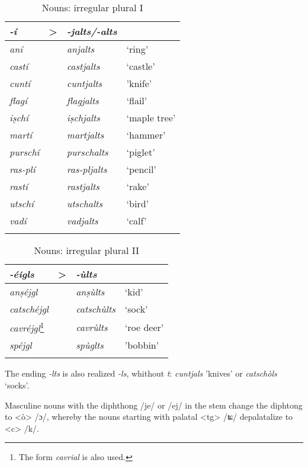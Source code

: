 \begin{table}
\caption{Nouns: irregular plural I}
\label{irregplI}
 \begin{tabular}{llll}
  \lsptoprule
   \textit{-í} & > & \textit{-jalts/-alts}  \\
  \midrule
\textit{aní} && \textit{anjalts} & `ring'\\
\textit{castí} && \textit{castjalts} & `castle' \\
\textit{cuntí} && \textit{cuntjalts} & 'knife' \\
\textit{flagí}  &&   \textit{flagjalts} & `flail' \\
\textit{iṣchí} && \textit{iṣchjalts} & `maple tree'\\
\textit{martí} && \textit{martjalts} &`hammer'\\
\textit{purschí} && \textit{purschalts} & `piglet'\\
\textit{ras-plí} && \textit{ras-pljalts} & `pencil'\\
\textit{rastí} && \textit{rastjalts} & `rake'\\
\textit{utschí} && \textit{utschalts}  &`bird'\\
\textit{vadí} && \textit{vadjalts} & `calf'\\
  \lspbottomrule
 \end{tabular}
\end{table}

\begin{table}
\caption{Nouns: irregular plural II}
\label{irregplII}
 \begin{tabular}{llll}
  \lsptoprule
    \textit{-éigls} & > & \textit{-ùlts}\\
  \midrule
\textit{anṣéjgl} && \textit{anṣùlts} & `kid'\\
\textit{catschéjgl} && \textit{catschùlts} & `sock'\\
\textit{cavréjgl}\footnote{The form \textit{cavrial} is also used.} && \textit{cavrùlts} & `roe deer'\\
\textit{spéjgl} && \textit{spùglts} & 'bobbin'\\
 \lspbottomrule
 \end{tabular}
\end{table}

The ending \textit{-lts } is also realized \textit{-ls}, whithout \textit{t}: \textit{cuntjals} 'knives' or \textit{catschòls} `socks'.

Masculine nouns with the diphthong /je/ or /ej/ in the stem change the diphtong to <ò> /ɔ/, whereby the nouns starting with palatal <tg> /ʨ/ depalatalize to <c> /k/.


